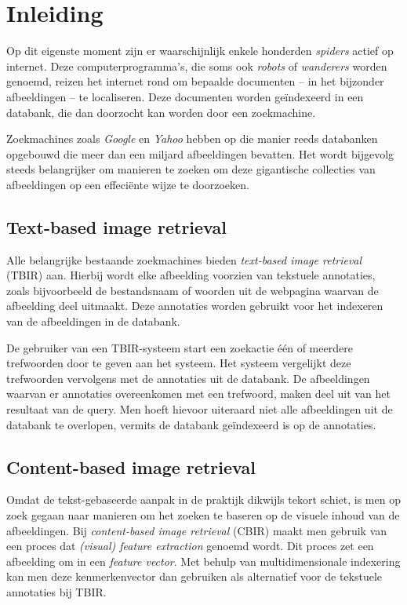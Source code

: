 \chapter{Inleiding}

Op dit eigenste moment zijn er waarschijnlijk enkele honderden \emph{spiders} actief op internet.
Deze computerprogramma's, die soms ook \emph{robots} of \emph{wanderers} worden genoemd, reizen
het internet rond om bepaalde documenten -- in het bijzonder afbeeldingen -- te localiseren. Deze 
documenten worden ge\"indexeerd in een databank, die dan doorzocht kan worden door een zoekmachine. 

Zoekmachines zoals \emph{Google} en \emph{Yahoo} hebben op die manier reeds databanken
opgebouwd die meer dan een miljard afbeeldingen bevatten. Het wordt bijgevolg steeds belangrijker
om manieren te zoeken om deze gigantische collecties van afbeeldingen op een effeci\"ente wijze
te doorzoeken.


\section{Text-based image retrieval}

Alle belangrijke bestaande zoekmachines bieden \emph{text-based image retrieval} (TBIR) aan. 
Hierbij wordt elke afbeelding voorzien van tekstuele annotaties, zoals bijvoorbeeld de 
bestandsnaam of woorden uit de webpagina waarvan de afbeelding deel uitmaakt. Deze annotaties
worden gebruikt voor het indexeren van de afbeeldingen in de databank.

De gebruiker van een TBIR-systeem start een zoekactie \'e\'en of meerdere trefwoorden door te geven
aan het systeem. Het systeem vergelijkt deze trefwoorden vervolgens met de annotaties uit
de databank. De afbeeldingen waarvan er annotaties overeenkomen met een trefwoord, maken
deel uit van het resultaat van de query. Men hoeft hievoor uiteraard niet alle afbeeldingen
uit de databank te overlopen, vermits de databank ge\"indexeerd is op de annotaties. 

\section{Content-based image retrieval}

Omdat de tekst-gebaseerde aanpak in de praktijk dikwijls tekort schiet, is men op zoek gegaan 
naar manieren om het zoeken te baseren op de visuele inhoud van de afbeeldingen. Bij 
\emph{content-based image retrieval} (CBIR) maakt men gebruik van een proces dat 
\emph{(visual) feature extraction} genoemd wordt. Dit proces zet een afbeelding om in een 
\emph{feature vector}. Met behulp van multidimensionale indexering kan men deze kenmerkenvector
dan gebruiken als alternatief voor de tekstuele annotaties bij TBIR.

